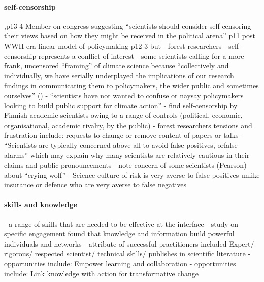 \paragraph{self-censorship}
\cite{Pielke2007},p13-4 Member on congress suggesting ``scientists should consider self-censoring their views based on how they might be received in the political arena'' p11 post WWII era linear model of policymaking p12-3 but \cite{OjanenBKP2021} - forest researchers - self-censorship represents a conflict of interest
\cite{SimmsA2020,Carton2021,Bendell2024} - some scientists calling for a more frank, uncensored ``framing'' of climate science because ``collectively and individually, we have serially underplayed the implications of our research findings in communicating them to policymakers, the wider public and sometimes ourselves'' (\cite{CalverleyA2022})
\cite{Pearce2024} - ``scientists have not wanted to confuse or naysay policymakers looking to build public support for climate action''
\cite{ValiverronenS2021} - find self-censorship by Finnish academic scientists owing to a range of controls (political, economic, organisational, academic rivalry, by the public) 
\cite{OjanenBKP2021} - forest researchers tensions and frustration include: requests to change or remove content of papers or talks
\cite{ReadO2017} - ``Scientists are typically concerned above all to avoid false positives, orfalse alarms'' which may explain why many scientists are relatively cautious in their claims and public pronouncements
\cite{GregoryBW2024} - note concern of some scientists (Pearson) about ``crying wolf''
\cite{PoeS2023} - Science culture of risk is very averse to false positives unlike insurance or defence who are very averse to false negatives

\paragraph{skills and knowledge}
\cite{BednarekSHG2015,Mintrom2019} - a range of skills that are needed to be effective at the interface
\cite{Braun2009} - study on specific engagement found that knowledge and information build powerful individuals and networks
\cite{GogginEtAl2015} - attribute of successful practitioners included Expert/ rigorous/ respected scientist/ technical skills/ publishes in scientific literature
\cite{MoallemiZHSMZHKHMGLB2023} - opportunities include: Empower learning and collaboration
\cite{MoallemiZHSMZHKHMGLB2023} - opportunities include: Link knowledge with action for transformative change

